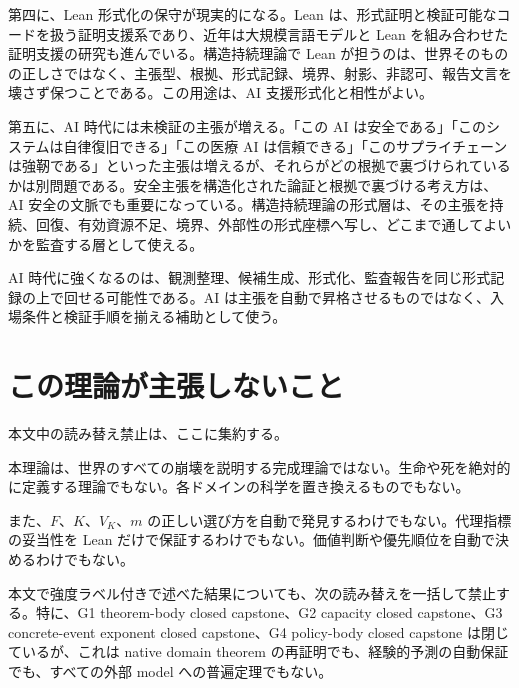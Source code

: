 \documentclass[12pt,a4paper]{article}
\begin{document}
第四に、Lean 形式化の保守が現実的になる。Lean は、形式証明と検証可能なコードを扱う証明支援系であり、近年は大規模言語モデルと Lean を組み合わせた証明支援の研究も進んでいる。構造持続理論で Lean が担うのは、世界そのものの正しさではなく、主張型、根拠、形式記録、境界、射影、非認可、報告文言を壊さず保つことである。この用途は、AI 支援形式化と相性がよい。

第五に、AI 時代には未検証の主張が増える。「この AI は安全である」「このシステムは自律復旧できる」「この医療 AI は信頼できる」「このサプライチェーンは強靭である」といった主張は増えるが、それらがどの根拠で裏づけられているかは別問題である。安全主張を構造化された論証と根拠で裏づける考え方は、AI 安全の文脈でも重要になっている。構造持続理論の形式層は、その主張を持続、回復、有効資源不足、境界、外部性の形式座標へ写し、どこまで通してよいかを監査する層として使える。

AI 時代に強くなるのは、観測整理、候補生成、形式化、監査報告を同じ形式記録の上で回せる可能性である。AI は主張を自動で昇格させるものではなく、入場条件と検証手順を揃える補助として使う。

\section{この理論が主張しないこと}\label{ux3053ux306eux7406ux8ad6ux304cux4e3bux5f35ux3057ux306aux3044ux3053ux3068}

本文中の読み替え禁止は、ここに集約する。

本理論は、世界のすべての崩壊を説明する完成理論ではない。生命や死を絶対的に定義する理論でもない。各ドメインの科学を置き換えるものでもない。

また、\(F\)、\(K\)、\(V_K\)、\(m\) の正しい選び方を自動で発見するわけでもない。代理指標の妥当性を Lean だけで保証するわけでもない。価値判断や優先順位を自動で決めるわけでもない。

本文で強度ラベル付きで述べた結果についても、次の読み替えを一括して禁止する。特に、G1 theorem-body closed capstone、G2 capacity closed capstone、G3 concrete-event exponent closed capstone、G4 policy-body closed capstone は閉じているが、これは native domain theorem の再証明でも、経験的予測の自動保証でも、すべての外部 model への普遍定理でもない。
\end{document}
